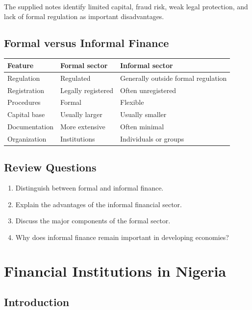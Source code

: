 \documentclass[
]{article}
\newcounter{none} %
\providecommand{\tightlist}{%
  \setlength{\itemsep}{0pt}\setlength{\parskip}{0pt}}
\begin{document}
The supplied notes identify limited capital, fraud risk, weak legal protection, and lack of formal regulation as important disadvantages.

\subsection{Formal versus Informal Finance}\label{formal-versus-informal-finance}

{\def\LTcaptype{none} %
\begin{longtable}[]{@{}lll@{}}
\toprule\noalign{}
Feature & Formal sector & Informal sector \\
\midrule\noalign{}
\endhead
\bottomrule\noalign{}
\endlastfoot
Regulation & Regulated & Generally outside formal regulation \\
Registration & Legally registered & Often unregistered \\
Procedures & Formal & Flexible \\
Capital base & Usually larger & Usually smaller \\
Documentation & More extensive & Often minimal \\
Organization & Institutions & Individuals or groups \\
\end{longtable}
}

\subsection{Review Questions}\label{review-questions-1}

\begin{enumerate}
\def\labelenumi{\arabic{enumi}.}
\tightlist
\item
  Distinguish between formal and informal finance.
\item
  Explain the advantages of the informal financial sector.
\item
  Discuss the major components of the formal sector.
\item
  Why does informal finance remain important in developing economies?
\end{enumerate}

\section{Financial Institutions in Nigeria}\label{financial-institutions-in-nigeria}

\subsection{Introduction}\label{introduction-3}
\end{document}
